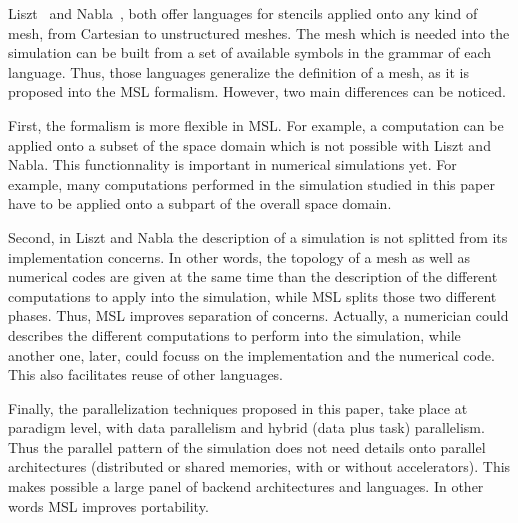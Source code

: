 Liszt~\cite{DeVito:2011:LDS:2063384.2063396} and Nabla~\cite{Camier:2015:IPP:2820083.2820107}, both offer languages for stencils applied onto any kind of mesh, from Cartesian to unstructured meshes. The mesh which is needed into the simulation can be built from a set of available symbols in the grammar of each language. Thus, those languages generalize the definition of a mesh, as it is proposed into the MSL formalism. 
However, two main differences can be noticed. 

First, the formalism is more flexible in MSL. For example, a computation can be applied onto a subset of the space domain which is not possible with Liszt and Nabla. This functionnality is important in numerical simulations yet. For example, many computations performed in the simulation studied in this paper have to be applied onto a subpart of the overall space domain.

Second, in Liszt and Nabla the description of a simulation is not splitted from its implementation concerns. In other words, the topology of a mesh as well as numerical codes are given at the same time than the description of the different computations to apply into the simulation, while MSL splits those two different phases. Thus, MSL improves separation of concerns. Actually, a numerician could describes the different computations to perform into the simulation, while another one, later, could focuss on the implementation and the numerical code. This also facilitates reuse of other languages. 

Finally, the parallelization techniques proposed in this paper, take place at paradigm level, with data parallelism and hybrid (data plus task) parallelism. Thus the parallel pattern of the simulation does not need details onto parallel architectures (distributed or shared memories, with or without accelerators). This makes possible a large panel of backend architectures and languages. In other words MSL improves portability.